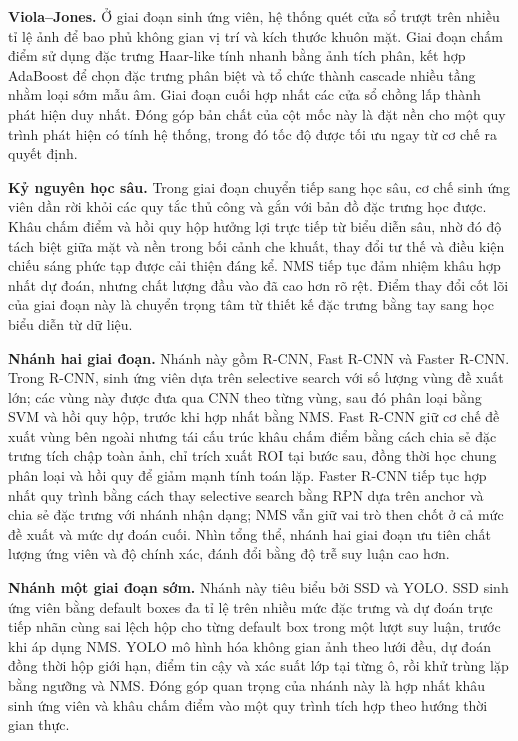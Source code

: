 \noindent\textbf{Viola--Jones.}
Ở giai đoạn sinh ứng viên, hệ thống quét cửa sổ trượt trên nhiều tỉ lệ ảnh để bao phủ không gian vị trí và kích thước khuôn mặt.
Giai đoạn chấm điểm sử dụng đặc trưng Haar-like tính nhanh bằng ảnh tích phân, kết hợp AdaBoost để chọn đặc trưng phân biệt và tổ chức thành cascade nhiều tầng nhằm loại sớm mẫu âm.
Giai đoạn cuối hợp nhất các cửa sổ chồng lấp thành phát hiện duy nhất.
Đóng góp bản chất của cột mốc này là đặt nền cho một quy trình phát hiện có tính hệ thống, trong đó tốc độ được tối ưu ngay từ cơ chế ra quyết định.  \cite{li2012facechapter,viola2001rapid,viola2004robust}

\noindent\textbf{Kỷ nguyên học sâu.}
Trong giai đoạn chuyển tiếp sang học sâu, cơ chế sinh ứng viên dần rời khỏi các quy tắc thủ công và gắn với bản đồ đặc trưng học được.
Khâu chấm điểm và hồi quy hộp hưởng lợi trực tiếp từ biểu diễn sâu, nhờ đó độ tách biệt giữa mặt và nền trong bối cảnh che khuất, thay đổi tư thế và điều kiện chiếu sáng phức tạp được cải thiện đáng kể.
NMS tiếp tục đảm nhiệm khâu hợp nhất dự đoán, nhưng chất lượng đầu vào đã cao hơn rõ rệt.
Điểm thay đổi cốt lõi của giai đoạn này là chuyển trọng tâm từ thiết kế đặc trưng bằng tay sang học biểu diễn từ dữ liệu.

\noindent\textbf{Nhánh hai giai đoạn.}
Nhánh này gồm R-CNN, Fast R-CNN và Faster R-CNN.
Trong R-CNN, sinh ứng viên dựa trên selective search với số lượng vùng đề xuất lớn; các vùng này được đưa qua CNN theo từng vùng, sau đó phân loại bằng SVM và hồi quy hộp, trước khi hợp nhất bằng NMS.  \cite{girshick2014rcnn}
Fast R-CNN giữ cơ chế đề xuất vùng bên ngoài nhưng tái cấu trúc khâu chấm điểm bằng cách chia sẻ đặc trưng tích chập toàn ảnh, chỉ trích xuất ROI tại bước sau, đồng thời học chung phân loại và hồi quy để giảm mạnh tính toán lặp.  \cite{girshick2015fast}
Faster R-CNN tiếp tục hợp nhất quy trình bằng cách thay selective search bằng RPN dựa trên anchor và chia sẻ đặc trưng với nhánh nhận dạng; NMS vẫn giữ vai trò then chốt ở cả mức đề xuất và mức dự đoán cuối.  \cite{ren2015faster}
Nhìn tổng thể, nhánh hai giai đoạn ưu tiên chất lượng ứng viên và độ chính xác, đánh đổi bằng độ trễ suy luận cao hơn.

\noindent\textbf{Nhánh một giai đoạn sớm.}
Nhánh này tiêu biểu bởi SSD và YOLO.
SSD sinh ứng viên bằng default boxes đa tỉ lệ trên nhiều mức đặc trưng và dự đoán trực tiếp nhãn cùng sai lệch hộp cho từng default box trong một lượt suy luận, trước khi áp dụng NMS.  \cite{liu2016ssd}
YOLO mô hình hóa không gian ảnh theo lưới đều, dự đoán đồng thời hộp giới hạn, điểm tin cậy và xác suất lớp tại từng ô, rồi khử trùng lặp bằng ngưỡng và NMS.  \cite{redmon2016yolo}
Đóng góp quan trọng của nhánh này là hợp nhất khâu sinh ứng viên và khâu chấm điểm vào một quy trình tích hợp theo hướng thời gian thực.

